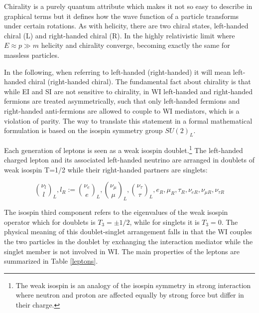 Chirality is a purely quantum attribute which makes it not so easy to describe in graphical terms but it defines how the wave function of a particle transforms under certain rotations. As with helicity, there are two chiral states, left-handed chiral (L) and right-handed chiral (R). In the highly relativistic limit where $E\approx p \gg m$ helicity and chirality converge, becoming exactly the same for massless particles.

In the following, when referring to left-handed (right-handed) it will mean left-handed chiral (right-handed chiral). The fundamental fact about chirality is that while EI and SI are not sensitive to chirality, in WI left-handed and right-handed fermions are treated asymmetrically, such that only left-handed fermions and right-handed anti-fermions are allowed to couple to WI mediators, which is a violation of parity. The way to translate this statement in a formal mathematical formulation is based on the isospin symmetry group $SU(2)_L$.

Each generation of leptons is seen as a weak isospin doublet.\footnote{The weak isospin is an analogy of the isospin symmetry in strong interaction where neutron and proton are affected equally by strong force but differ in their charge.} The left-handed charged lepton and its associated left-handed neutrino are arranged in doublets of weak isospin T=1/2 while their right-handed partners are singlets:

\begin{equation}
\binom{\nu_l}{l}_L , l_R := \binom{\nu_e}{e}_L , \binom{\nu_\mu}{\mu}_L, \binom{\nu_\tau}{\tau}_L, e_R, \mu_R, \tau_R, \nu_{eR}, \nu_{\mu R}, \nu_{\tau R}
\label{lepton_multiplets}
\end{equation}

The isospin third component refers to the eigenvalues of the weak isospin operator which for doublets is $T_3 = \pm 1/2$, while for singlets it is $T_3=0$. The physical meaning of this doublet-singlet arrangement falls in that the WI couples the two particles in the doublet by exchanging the interaction mediator while the singlet member is not involved in WI. The main properties of the leptons are summarized in Table \ref{leptons}.


